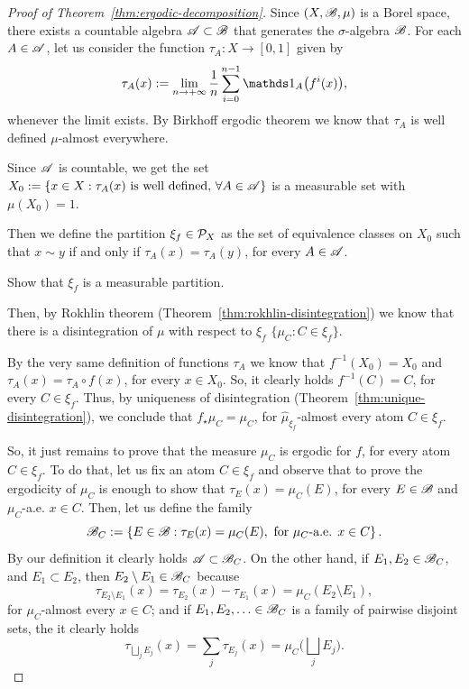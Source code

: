 \begin{proof}[Proof of Theorem~\ref{thm:ergodic-decomposition}]
  Since $(X,\mathscr{B},\mu)$ is a Borel space, there exists a countable algebra $\mathscr{A}\subset\mathscr{B}$ that generates the $\sigma$-algebra $\mathscr{B}$. For each $A\in\mathscr{A}$, let us consider the function $\tau_{A}\colon X\to [0,1]$ given by
  \begin{displaymath}
    \tau_{A}(x):=\lim_{n\to+\infty}\frac{1}{n}\sum_{i=0}^{n-1}\ds{1}_{A}\big(f^{i}(x)\big),
  \end{displaymath}
  whenever the limit exists. By Birkhoff ergodic theorem we know that $\tau_{A}$ is well defined $\mu$-almost everywhere.

  Since $\mathscr{A}$ is countable, we get the set $X_{0}:=\{x\in X : \tau_{A}(x) \text{ is well defined, }\forall A\in\mathscr{A}\}$ is a measurable set with $\mu(X_{0})=1$.

  Then we define the partition $\xi_{f}\in\mathcal{P}_{X}$ as the set of equivalence classes on $X_{0}$ such that $x\sim y$ if and only if $\tau_{A}(x)=\tau_{A}(y)$, for every $A\in\mathscr{A}$.

  \begin{exercise}
    Show that $\xi_{f}$ is a measurable partition.
  \end{exercise}

  Then, by Rokhlin theorem (Theorem~\ref{thm:rokhlin-disintegration}) we know that there is a disintegration of $\mu$ with respect to $\xi_{f}$ $\{\mu_{C} : C\in\xi_{f}\}$.

  By the very same definition of functions $\tau_{A}$ we know that $f^{-1}(X_{0})=X_{0}$ and  $\tau_{A}(x)=\tau_{A}\circ f(x)$, for every $x\in X_{0}$. So, it clearly holds $f^{-1}(C)=C$, for every $C\in\xi_{f}$. Thus, by uniqueness of disintegration (Theorem~\ref{thm:unique-disintegration}), we conclude that $f_{\star}\mu_{C}=\mu_{C}$, for $\hat\mu_{\xi_{f}}$-almost every atom $C\in\xi_{f}$.

  So, it just remains to prove that the measure $\mu_{C}$ is ergodic for $f$, for every atom $C\in\xi_{f}$. To do that, let us fix an atom $C\in\xi_{f}$ and observe that to prove the ergodicity of $\mu_{C}$ is enough to show that $\tau_{E}(x)=\mu_{C}(E)$, for every $E\in\mathscr{B}$ and $\mu_{C}$-a.e. $x\in C$. Then, let us define the family
  \begin{displaymath}
    \B_{C}:=\left\{E\in\B : \tau_{E}(x)=\mu_{C}(E),\ \text{for }\mu_{C}\text{-a.e. }x\in C\right\}.
  \end{displaymath}
  By our definition it clearly holds $\mathscr{A}\subset\mathscr{B}_{C}$. On the other hand, if $E_{1},E_{2}\in\mathscr{B}_{C}$, and $E_{1}\subset E_{2}$, then $E_{2}\setminus E_{1}\in\mathscr{B}_{C}$ because
  \begin{displaymath}
    \tau_{E_{2}\setminus E_{1}}(x)=\tau_{E_{2}}(x)-\tau_{E_{1}}(x) = \mu_{C}(E_{2}\setminus E_{1}),
  \end{displaymath}
  for $\mu_{C}$-almost every $x\in C$; and if $E_{1},E_{2},\ldots\in\mathscr{B}_{C}$ is a family of pairwise disjoint sets, the it clearly holds
  \begin{displaymath}
    \tau_{\bigsqcup_{j}E_{j}}(x) = \sum_{j}\tau_{E_{j}}(x)= \mu_{C}\bigg(\bigsqcup_{j} E_{j}\bigg).
  \end{displaymath}


\end{proof}
